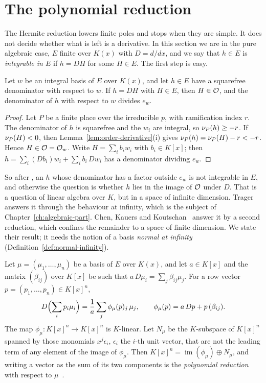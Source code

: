 \section{The polynomial reduction\later}\label{sec:hermite-polynomial}

The Hermite reduction lowers finite poles and stops when they are simple. It
does not decide whether what is left is a derivative. In this section we are
in the pure algebraic case, $E$ finite over $K(x)$ with $D = d/dx$, and we
say that $h \in E$ is \emph{integrable in $E$} if $h = DH$ for some $H \in
E$. The first step is easy.

\begin{proposition}\label{prop:integrable-remainder}
Let $w$ be an integral basis of $E$ over $K(x)$, and let $h \in E$ have a
squarefree denominator with respect to $w$. If $h = DH$ with $H \in E$, then
$H \in \mathcal{O}$, and the denominator of $h$ with respect to $w$ divides $e_w$.
\end{proposition}

\begin{proof}
Let $P$ be a finite place over the irreducible $p$, with ramification index
$r$. The denominator of $h$ is squarefree and the $w_i$ are integral, so
$\nu_{P}(h) \ge -r$. If $\nu_{P}(H) < 0$, then
Lemma~\ref{lem:order-derivative}(i) gives $\nu_{P}(h) = \nu_{P}(H) - r < -r$.
Hence $H \in \mathcal{O} = \mathcal{O}_w$. Write $H = \sum_i b_i w_i$ with $b_i \in K[x]$; then
$h = \sum_i (Db_i) w_i + \sum_i b_i\, Dw_i$ has a denominator dividing $e_w$.
\end{proof}

So after , an $h$ whose denominator has a factor
outside $e_w$ is not integrable in $E$, and otherwise the question is whether
$h$ lies in the image of $\mathcal{O}$ under $D$. That is a question of linear
algebra over $K$, but in a space of infinite dimension. Trager answers it
through the behaviour at infinity, which is the subject of
Chapter~\ref{ch:algebraic-part}. Chen, Kauers and Koutschan~\cite{chen2016}
answer it by a second reduction, which confines the remainder to a space of
finite dimension. We state their result; it needs the notion of a basis
\emph{normal at infinity} (Definition~\ref{def:normal-infinity}).

Let $\mu = (\mu_1, \dots, \mu_n)$ be a basis of $E$ over $K(x)$, and let $a
\in K[x]$ and the matrix $(\beta_{ij})$ over $K[x]$ be such that $a\, D\mu_i =
\sum_j \beta_{ij} \mu_j$. For a row vector $p = (p_1, \dots, p_n) \in K[x]^n$,
\[
  D\Bigl( \sum_i p_i \mu_i \Bigr) = \frac{1}{a} \sum_j \phi_\mu(p)_j\, \mu_j,
  \qquad \phi_\mu(p) = a\, Dp + p\, (\beta_{ij}) .
\]
The map $\phi_\mu : K[x]^n \to K[x]^n$ is $K$-linear. Let $N_\mu$ be the
$K$-subspace of $K[x]^n$ spanned by those monomials $x^j \epsilon_i$,
$\epsilon_i$ the $i$-th unit vector, that are not the leading term of any
element of the image of $\phi_\mu$. Then $K[x]^n = \operatorname{im}(\phi_\mu)
\oplus N_\mu$, and writing a vector as the sum of its two components is the
\emph{polynomial reduction} with respect to
$\mu$~\cite[Definitions~9 and~10]{chen2016}.


